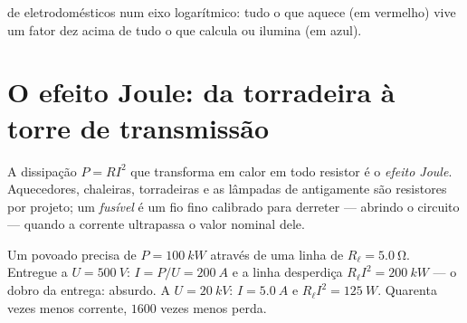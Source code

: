 \begin{omfigure}

{\small {} de eletrodomésticos num eixo logarítmico: tudo o que
aquece (em vermelho) vive um fator dez acima de tudo o que calcula ou
ilumina (em azul).}
\end{omfigure}

\section{O efeito Joule: da torradeira à torre de transmissão}

\begin{definition}\label{def:g11:circuits-and-power:joule}
A dissipação $P = RI^2$ que transforma  em calor em todo
resistor é o \emph{efeito Joule}. Aquecedores,
chaleiras, torradeiras e as lâmpadas de antigamente são resistores por
projeto; um \emph{fusível} é um fio fino calibrado para
derreter --- abrindo o circuito --- quando a corrente ultrapassa o valor
nominal dele.
\end{definition}

\begin{example}\label{ex:g11:circuits-and-power:transmission}
Um povoado precisa de $P = \qty{100}{kW}$ através de uma linha de
 $R_\ell = \qty{5.0}{\ohm}$. Entregue a $U = \qty{500}{V}$:
$I = P/U = \qty{200}{A}$ e a linha desperdiça
$R_\ell I^2 = \qty{200}{kW}$ --- o dobro da entrega: absurdo. A
$U = \qty{20}{kV}$: $I = \qty{5.0}{A}$ e $R_\ell I^2 = \qty{125}{W}$.
Quarenta vezes menos corrente, $1600$ vezes menos perda.
\end{example}

